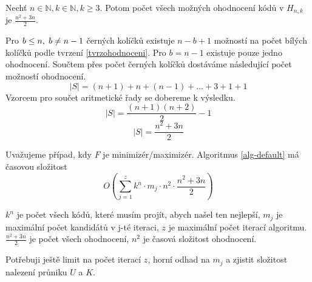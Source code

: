 
\begin{tvrz}
Nechť $n\in \mathbb{N}, k\in \mathbb{N}, k \geq 3$. Potom počet všech možných ohodnocení kódů v $H_{n,k}$ je $\frac{n^2 + 3n}{2}$.
\end{tvrz}
\begin{dukaz}
Pro $b \leq n,\hspace{3px} b \neq n-1$ černých kolíčků existuje $n-b+1$ možností na počet bílých kolíčků podle tvrzení \ref{tvrzohodnoceni}. Pro $b = n-1$ existuje pouze jedno ohodnocení. Součtem přes počet černých kolíčků dostáváme následující počet možností ohodnocení.
    \[|S| = (n+1) + n + (n-1)  + \dots + 3 + 1 + 1 \]
Vzorcem pro součet aritmetické řady se dobereme k výsledku.
    \[|S| = \frac{(n+1)(n+2)}{2} - 1 \]
    \[|S| = \frac{n^2 + 3n}{2}\]
\end{dukaz}

\begin{tvrz}
    Uvažujeme případ, kdy $F$ je minimizér/maximizér.
    Algoritmus \ref{alg-default} má časovou složitost
    \[O \left( \sum_{j = 1}^z k^n \cdot m_j \cdot n^2 \cdot \frac{n^2 + 3n}{2}\right)\]
    
\end{tvrz}
\begin{dukaz}
    $k^n$ je počet všech kódů, které musím projít, abych našel ten nejlepší, $m_j$ je maximální počet kandidátů v j-té iteraci, $z$ je maximální počet iterací algoritmu. $\frac{n^2 + 3n}{2}$ je počet všech ohodnocení, $n^2$ je časová složitost ohodnocení.

    Potřebuji ještě limit na počet iterací $z$, horní odhad na $m_j$ a zjistit složitost nalezení průniku $U$ a $K$.
\end{dukaz}

